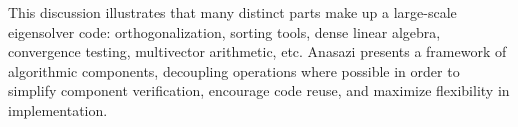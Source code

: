 \documentclass[acmtoms]{acmtrans2m}
\newcounter{algorithm}
\begin{document}


% 

This discussion illustrates that many distinct parts make up a
large-scale eigensolver code: orthogonalization, sorting tools, dense
linear algebra, convergence testing, multivector arithmetic, etc.
Anasazi presents a framework of algorithmic components, decoupling
operations where possible in order to simplify component verification,
encourage code reuse, and maximize flexibility in implementation.
\end{document}
